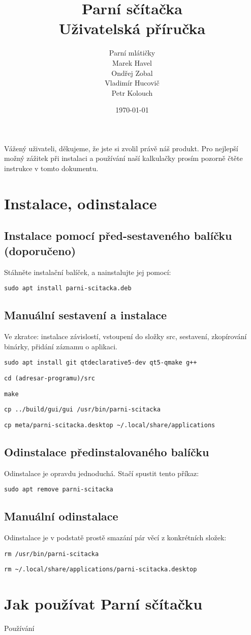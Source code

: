 \documentclass[a4paper]{article}
\title{\Huge Parní sčítačka\\\Large Uživatelská příručka}
\author{\large Parní mlátičky \\\normalsize Marek Havel \\\normalsize Ondřej Zobal\\\normalsize Vladimír Hucovič\\\normalsize Petr Kolouch}
\date{\today}
\begin{document}
\maketitle

Vážený uživateli, děkujeme, že jste si zvolil právě náš produkt. Pro nejlepší možný zážitek při instalaci a používání naší kalkulačky prosím pozorně čtěte instrukce v tomto dokumentu.

\section*{Instalace, odinstalace}

\subsection*{Instalace pomocí před-sestaveného balíčku (doporučeno)}

Stáhněte instalační balíček, a nainstalujte jej pomocí:

\verb|sudo apt install parni-scitacka.deb|

\subsection*{Manuální sestavení a instalace}

Ve zkratce: instalace závislostí, vstoupení do složky src, sestavení, zkopírování binárky, přidání záznamu o aplikaci.

\verb|sudo apt install git qtdeclarative5-dev qt5-qmake g++|

\verb|cd (adresar-programu)/src|

\verb|make|

\verb|cp ../build/gui/gui /usr/bin/parni-scitacka|

\verb|cp meta/parni-scitacka.desktop ~/.local/share/applications|

\subsection*{Odinstalace předinstalovaného balíčku}

Odinstalace je opravdu jednoduchá. Stačí spustit tento příkaz:

\verb|sudo apt remove parni-scitacka|

\subsection*{Manuální odinstalace}

Odinstalace je v podstatě prostě smazání pár věcí z konkrétních složek:

\verb|rm /usr/bin/parni-scitacka|

\verb|rm ~/.local/share/applications/parni-scitacka.desktop|

\pagebreak
\section*{Jak používat Parní sčítačku}

Používání
\end{document}
